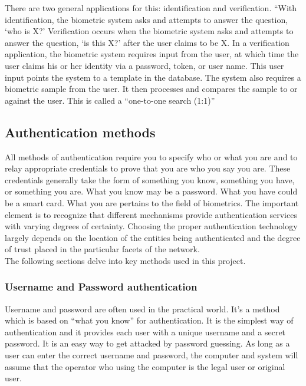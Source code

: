 \documentclass[12pt]{article}			%
\begin{document}
There are two general applications for this: identification and verification. “With identification, the biometric system asks and attempts to answer the question, ‘who is X?’ Verification occurs when the biometric system asks and attempts to answer the question, ‘is this X?’ after the user claims to be X. In a verification application, the biometric system requires input from the user, at which time the user claims his or her identity via a password, token, or user name. This user input points the system to a template in the database. The system also requires a biometric sample from the user. It then processes and compares the sample to or against the user. This is called a “one-to-one search (1:1)”

\subsection{ Authentication methods }
All methods of authentication require you to specify who or what you are and to relay appropriate credentials to prove that you are who you say you are. These credentials generally take the form of something you know, something you have, or something you are. What you know may be a password. What you have could be a smart card. What you are pertains to the field of biometrics. The important element is to recognize that different mechanisms provide authentication services with varying degrees of certainty. Choosing the proper authentication technology largely depends on the location of the entities being authenticated and the degree of
trust placed in the particular facets of the network.\\
The following sections delve into key methods used in this project.

\subsubsection{ Username and Password authentication }
Username and password are often used in the practical world. It’s a method which is based on “what you know” for authentication. It is the simplest way of authentication and it provides each user with a unique username and a secret password. It is an easy way to get attacked by password guessing. As long as a user can enter the correct username and password, the computer and system will assume that the operator who using the computer is the legal user or original user.
\end{document}
